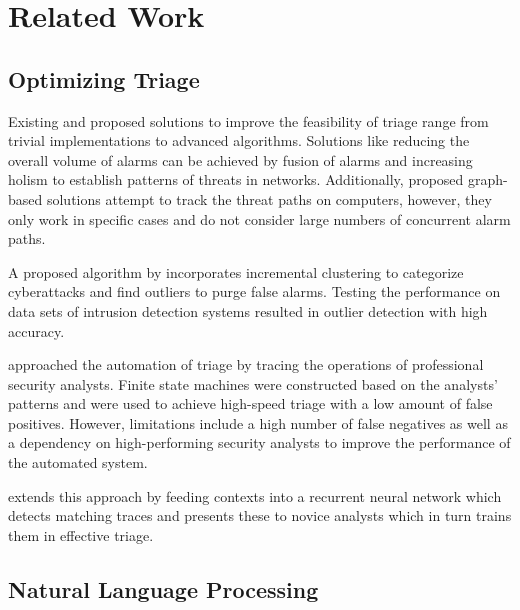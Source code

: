 \section{Related Work}
\label{sec:related-work}


\subsection{Optimizing Triage}
\label{subsec:optimizing-triage}

Existing and proposed solutions to improve the feasibility of triage range from trivial implementations to advanced
algorithms.
Solutions like reducing the overall volume of alarms can be achieved by fusion of alarms and increasing holism to
establish patterns of threats in networks.
Additionally, proposed graph-based solutions attempt to track the threat paths on computers, however, they only work
in specific cases and do not consider large numbers of concurrent alarm paths.\ \citep{ficke2022reconstructing}

A proposed algorithm by \citet{taheri2020cyberattack} incorporates incremental clustering to categorize cyberattacks
and find outliers to purge false alarms.
Testing the performance on data sets of intrusion detection systems resulted in outlier detection with high accuracy.

\citet{zhong2018learning} approached the automation of triage by tracing the operations of professional security
analysts.
Finite state machines were constructed based on the analysts' patterns and were used to achieve high-speed triage with
a low amount of false positives.
However, limitations include a high number of false negatives as well as a dependency on high-performing security
analysts to improve the performance of the automated system.

\citet{lin2018data} extends this approach by feeding contexts into a recurrent neural network which detects matching
traces and presents these to novice analysts which in turn trains them in effective triage.


\subsection{Natural Language Processing}
\label{subsec:natural-language-processing}

